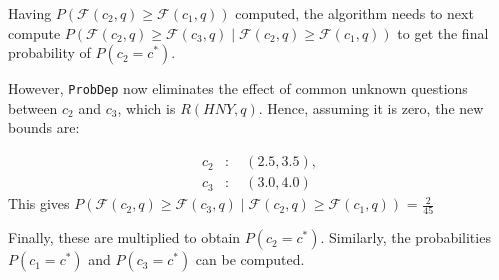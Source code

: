 Having $P(\mathcal{F}(c_2,q) \geq \mathcal{F}(c_1,q))$  computed, the algorithm needs to next compute \(P(\mathcal{F}(c_2,q) \geq \mathcal{F}(c_3,q) \mid \mathcal{F}(c_2,q)\geq \mathcal{F}(c_1,q))\) to get the final probability of $P(c_2 = c^*)$. 

However, {\tt ProbDep} now eliminates the effect of common unknown questions between $c_2$ and $c_3$, which is $R(HNY, q)$. Hence, assuming it is zero, the new bounds are:

\[\begin{array}{ll}
    c_2 & : \quad (2.5, 3.5), \\ 
    c_3 & : \quad (3.0, 4.0)
    \end{array}
\]
This gives \(P(\mathcal{F}(c_2,q) \geq \mathcal{F}(c_3,q) \mid \mathcal{F}(c_2,q)\geq \mathcal{F}(c_1,q))\) = $\frac{2}{45}$

\begin{comment}
    \begin{figure}[ht]
    \centering
    \texttt{[image: figures/Example\_3\_6\_b.jpg]}
    \caption{\(\mathbf{P(c_2 \geq c_3 \mid c_2 \geq c_1)}\)}
    \label{fig:Example_3_6_a}
\end{figure}

\end{comment}

Finally, these are multiplied to obtain $P(c_2 = c^*)$. Similarly, the probabilities \( P(c_1 = c^*) \) and \( P(c_3 = c^*) \) can be computed.

